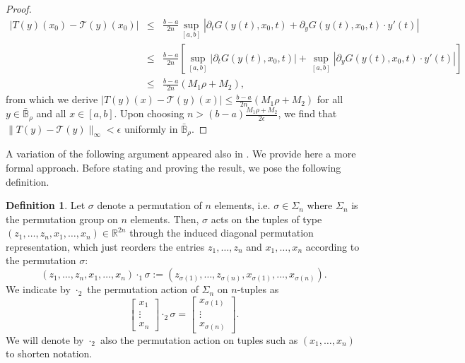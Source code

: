 \documentclass[a4paper,12pt,reqno]{amsart}
\theoremstyle{definition}
\newtheorem{df}[thm]{Definition}
\theoremstyle{remark}
\begin{document}
\begin{proof}
    \begin{eqnarray*}
        |T(y)(x_0) - \mathcal T(y)(x_0)| &\leq& \frac{b-a}{2n}\sup_{[a,b]} |\partial_t G(y(t),x_0,t) + \partial_y G(y(t),x_0,t)\cdot y'(t)|\\
                                         &\leq& \frac{b-a}{2n}[ \sup_{[a,b]} |\partial_t G(y(t),x_0,t)| + \sup_{[a,b]}|\partial_y G(y(t),x_0,t)\cdot y'(t)|]\\
                                         &\leq& \frac{b-a}{2n}(M_1\rho + M_2),
    \end{eqnarray*}  
    from which we derive $|T(y)(x) - \mathcal T(y)(x)| \leq \frac{b-a}{2n}(M_1\rho + M_2)$ for all $y\in \bar {\mathbb B}_\rho$ and all $x\in [a,b]$. Upon choosing $n > (b-a)\frac{M_1\rho + M_2}{2\epsilon}$, we find that $\|T(y) - \mathcal T(y)\|_{\infty} < \epsilon$ uniformly in $\bar {\mathbb B}_\rho$.
\end{proof}

A variation of the following argument appeared also in \cite{ANIE,ANIE_NAT}. We provide here a more formal approach. Before stating and proving the result, we pose the following definition. 

\begin{df}\label{def:actions}
    {\rm 
Let $\sigma$ denote a permutation of $n$ elements, i.e. $\sigma\in \Sigma_n$ where $\Sigma_n$ is the permutation group on $n$ elements. Then, $\sigma$ acts on the tuples of type $(z_1, \ldots, z_n, x_1, \ldots , x_n)\in \mathbb R^{2n}$ through the induced diagonal permutation representation, which just reorders the entries $z_1, \ldots , z_n$ and $x_1, \ldots , x_n$ according to the permutation $\sigma$: 
            $$(z_1, \ldots, z_n, x_1, \ldots, x_n)\cdot_1 \sigma := (z_{\sigma(1)}, \ldots, z_{\sigma(n)}, x_{\sigma(1)}, \ldots, x_{\sigma(n)}).$$ 
            We indicate by $\cdot_2$ the permutation action of $\Sigma_n$ on $n$-tuples as
            $$
                    \begin{bmatrix}
                                        x_1\\
                                        \vdots\\
                                        x_n
                                 \end{bmatrix}\cdot_2  \sigma = 
                                 \begin{bmatrix}
                                       x_{\sigma(1)}\\
                                       \vdots\\
                                       x_{\sigma(n)}
                                 \end{bmatrix}.
            $$
            We will denote by $\cdot_2$ also the permutation action on tuples such as $(x_1,\ldots, x_n)$ to shorten notation. 
    }
\end{df}
\end{document}
